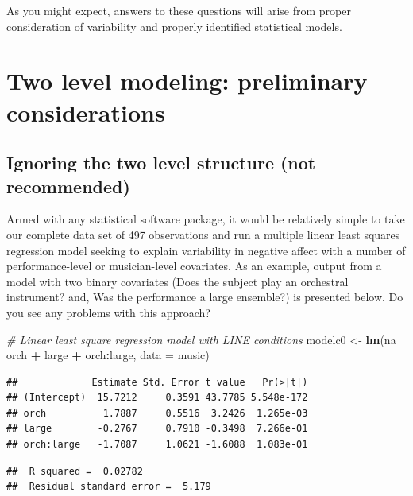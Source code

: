 \documentclass[
]{krantz}
\newenvironment{Shaded}{\begin{snugshade}}{\end{snugshade}}
\newcommand{\CommentTok}[1]{\textcolor[rgb]{0.37,0.37,0.37}{\textit{#1}}}
\newcommand{\DataTypeTok}[1]{\textcolor[rgb]{0.27,0.27,0.27}{#1}}
\newcommand{\KeywordTok}[1]{\textcolor[rgb]{0.27,0.27,0.27}{\textbf{#1}}}
\newcommand{\NormalTok}[1]{#1}
\newcommand{\OperatorTok}[1]{\textcolor[rgb]{0.43,0.43,0.43}{\textbf{#1}}}
\newcommand{\StringTok}[1]{\textcolor[rgb]{0.5,0.5,0.5}{#1}}
\begin{document}
As you might expect, answers to these questions will arise from proper consideration of variability and properly identified statistical models.

\hypertarget{twolevelmodeling}{%
\section{Two level modeling: preliminary considerations}\label{twolevelmodeling}}

\hypertarget{multregr}{%
\subsection{Ignoring the two level structure (not recommended)}\label{multregr}}

Armed with any statistical software package, it would be relatively simple to take our complete data set of 497 observations and run a multiple linear least squares regression model seeking to explain variability in negative affect with a number of performance-level or musician-level covariates. As an example, output from a model with two binary covariates (Does the subject play an orchestral instrument? and, Was the performance a large ensemble?) is presented below. Do you see any problems with this approach?

\begin{Shaded}
\begin{Highlighting}[]
\CommentTok{# Linear least square regression model with LINE conditions}
\NormalTok{modelc0 <-}\StringTok{ }\KeywordTok{lm}\NormalTok{(na }\OperatorTok{~}\StringTok{ }\NormalTok{orch }\OperatorTok{+}\StringTok{ }\NormalTok{large }\OperatorTok{+}\StringTok{ }\NormalTok{orch}\OperatorTok{:}\NormalTok{large, }\DataTypeTok{data =}\NormalTok{ music)}
\end{Highlighting}
\end{Shaded}

\begin{verbatim}
##             Estimate Std. Error t value   Pr(>|t|)
## (Intercept)  15.7212     0.3591 43.7785 5.548e-172
## orch          1.7887     0.5516  3.2426  1.265e-03
## large        -0.2767     0.7910 -0.3498  7.266e-01
## orch:large   -1.7087     1.0621 -1.6088  1.083e-01
\end{verbatim}

\begin{verbatim}
##  R squared =  0.02782 
##  Residual standard error =  5.179
\end{verbatim}
\end{document}
